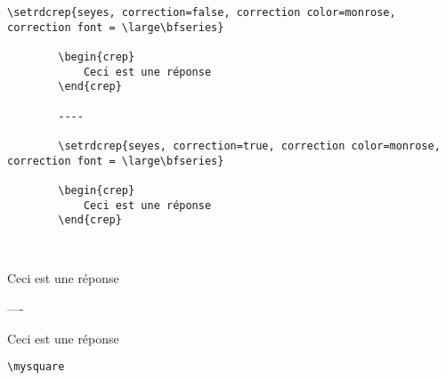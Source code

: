 \begin{tcolorbox}[colback=yellow!10!white, title=Exemple d'utilisation pour l'environnement\texttt{crep}]
    \begin{minipage}{0.45\textwidth}
    \begin{lstlisting}[breaklines]
        \setrdcrep{seyes, correction=false, correction color=monrose, correction font = \large\bfseries}
    
        \begin{crep}
            Ceci est une réponse
        \end{crep}
    
        ----
    
        \setrdcrep{seyes, correction=true, correction color=monrose, correction font = \large\bfseries}
        
        \begin{crep}
            Ceci est une réponse
        \end{crep}
    \end{lstlisting}
    \end{minipage}
    \hfill
    \begin{minipage}{0.45\textwidth}
    \phantom{a}\\
    
    \begin{crep}
        Ceci est une réponse
    \end{crep}

    ----

    
    \begin{crep}
        Ceci est une réponse
    \end{crep}
    \end{minipage}
    \end{tcolorbox}

\begin{tcolorbox}[colback=yellow!10!white, title=Exemple d'utilisation pour \texttt{mysquare}]
\begin{minipage}{0.45\textwidth}
\begin{lstlisting}[breaklines]
\mysquare
\end{lstlisting}
\end{minipage}
\hfill
\begin{minipage}{0.45\textwidth}
\phantom{a}\\
\mysquare
\end{minipage}
\end{tcolorbox}




